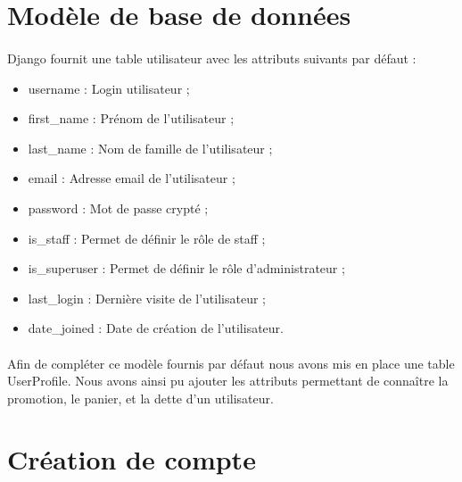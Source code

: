 \documentclass[twoside,UTF8]{EPURapport}
\begin{document}
    \section{Modèle de base de données}

        \paragraph{}Django fournit une table utilisateur avec les attributs suivants par défaut :\\
        \begin{itemize}
            \item username : Login utilisateur ;\\
            \item first\_name : Prénom de l'utilisateur ;\\
            \item last\_name : Nom de famille de l'utilisateur ;\\
            \item email : Adresse email de l'utilisateur ; \\
            \item password : Mot de passe crypté ;\\
            \item is\_staff : Permet de définir le rôle de staff ;\\
            \item is\_superuser : Permet de définir le rôle d'administrateur ;\\
            \item last\_login : Dernière visite de l'utilisateur ;\\
            \item date\_joined : Date de création de l'utilisateur.\\
        \end{itemize}

        \paragraph{}Afin de compléter ce modèle fournis par défaut nous avons mis en place une table UserProfile. Nous
avons ainsi pu ajouter les attributs permettant de connaître la promotion, le panier, et la dette d'un utilisateur.

    \section{Création de compte}
\end{document}
